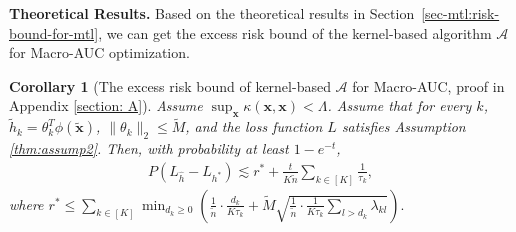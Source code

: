 \documentclass{article}
\def\vx{{\mathbf{x}}}
\newtheorem{corollary}{Corollary}
\begin{document}
\textbf{Theoretical Results.} Based on the theoretical results in Section~\ref{sec-mtl:risk-bound-for-mtl}, we can get the excess risk bound of the kernel-based algorithm $\mathcal{A}$ for Macro-AUC optimization. 
\begin{corollary}[The excess risk bound of kernel-based $\mathcal{A}$ for Macro-AUC, proof in Appendix \ref{section: A}] \label{thm: kernel comput AUC}   
    Assume $\sup_{\vx} \kappa(\vx,\vx) < \Lambda$. Assume that for every $k$,  $\tilde{h}_k = \theta_k^T\phi(\widetilde{\vx})$, $\|\theta_k\|_2 \leq \widetilde{M}$, and the loss function $L$ satisfies Assumption \ref{thm:assump2}. 
    Then, with probability at least $1 - e^{-t}$, 
\begin{align} \label{eq:kernel eq AUC}
    P (L_{\hat{h}} - L_{h^*}) \lesssim r^* + \frac{t}{K \tilde{n}} \sum_{k \in [K]} \frac{1}{\tau_k},
\end{align}
where $r^* \leq \sum _{k \in [K]} \min _{d_k \geq 0} (\frac{1}{\tilde{n}} \cdot \frac{d_k}{K \tau_k} + \widetilde{M} \sqrt{\frac{1}{\tilde{n}} \cdot \frac{1}{K \tau_k} \sum _{l >d_k} \lambda_{kl}}).$
\end{corollary}
\end{document}
